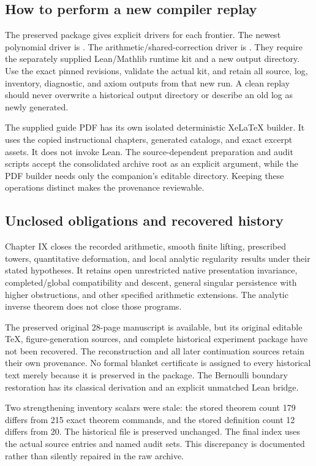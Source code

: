 \subsection{How to perform a new compiler replay}
The preserved package gives explicit drivers for each frontier. The newest polynomial driver is . The arithmetic/shared-correction driver is . They require the separately supplied Lean/Mathlib runtime kit and a new output directory. Use the exact pinned revisions, validate the actual kit, and retain all source, log, inventory, diagnostic, and axiom outputs from that new run. A clean replay should never overwrite a historical output directory or describe an old log as newly generated.

The supplied guide PDF has its own isolated deterministic XeLaTeX builder. It uses the copied instructional chapters, generated catalogs, and exact excerpt assets. It does not invoke Lean. The source-dependent preparation and audit scripts accept the consolidated archive root as an explicit argument, while the PDF builder needs only the companion's editable directory. Keeping these operations distinct makes the provenance reviewable.

\subsection{Unclosed obligations and recovered history}
Chapter IX closes the recorded arithmetic, smooth finite lifting, prescribed towers, quantitative deformation, and local analytic regularity results under their stated hypotheses. It retains open unrestricted native presentation invariance, completed/global compatibility and descent, general singular persistence with higher obstructions, and other specified arithmetic extensions. The analytic inverse theorem does not close those programs.

The preserved original 28-page manuscript is available, but its original editable TeX, figure-generation sources, and complete historical experiment package have not been recovered. The reconstruction and all later continuation sources retain their own provenance. No formal blanket certificate is assigned to every historical text merely because it is preserved in the package. The Bernoulli boundary restoration has its classical derivation and an explicit unmatched Lean bridge.

Two strengthening inventory scalars were stale: the stored theorem count 179 differs from 215 exact theorem commands, and the stored definition count 12 differs from 20. The historical file is preserved unchanged. The final index uses the actual source entries and named audit sets. This discrepancy is documented rather than silently repaired in the raw archive.
